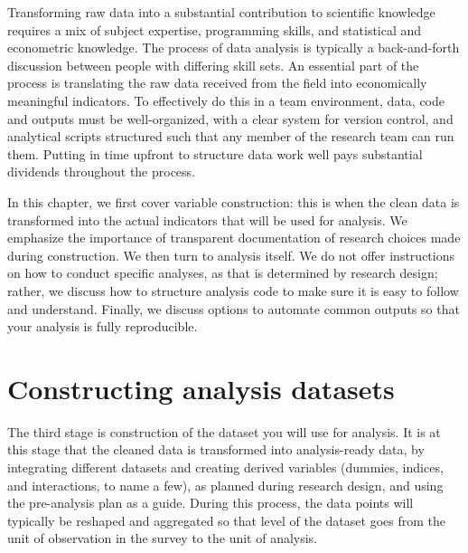 
\begin{fullwidth}
Transforming raw data into a substantial contribution to scientific knowledge
requires a mix of subject expertise, programming skills,
and statistical and econometric knowledge.
The process of data analysis is typically
a back-and-forth discussion between people
with differing skill sets.
An essential part of the process is translating the
raw data received from the field into economically meaningful indicators.
To effectively do this in a team environment,
data, code and outputs must be well-organized,
with a clear system for version control,
and analytical scripts structured such that any member of the research team can run them.
Putting in time upfront to structure data work well
pays substantial dividends throughout the process.

In this chapter, we first cover variable construction:
this is when the clean data is transformed
into the actual indicators that will be used for analysis.
We emphasize the importance of transparent documentation of research choices made during construction.
We then turn to analysis itself.
We do not offer instructions on how to conduct specific analyses,
as that is determined by research design;
rather, we discuss how to structure analysis code
to make sure it is easy to follow and understand.
Finally, we discuss options to automate common outputs
so that your analysis is fully reproducible.

\end{fullwidth}





\section{Constructing analysis datasets}

The third stage is construction of the dataset you will use for analysis.
It is at this stage that the cleaned data is transformed into analysis-ready data, 
by integrating different datasets and creating derived variables 
(dummies, indices, and interactions, to name a few),
as planned during research design,
and using the pre-analysis plan as a guide.
During this process, the data points will typically be reshaped and aggregated
so that level of the dataset goes from the unit of observation in the survey 
to the unit of analysis.


